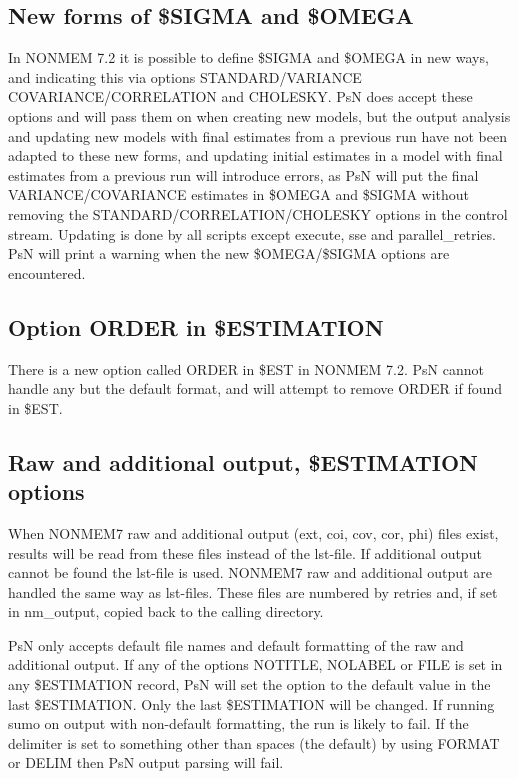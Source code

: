 \subsection{New forms of \$SIGMA and \$OMEGA}
In NONMEM 7.2 it is possible to define \$SIGMA and \$OMEGA in new ways, and indicating this via options STANDARD/VARIANCE COVARIANCE/CORRELATION and CHOLESKY. PsN does accept these options and will pass them on when creating new models, but the output analysis and updating new models with final estimates from a previous run have not been adapted to these new forms, and 
updating initial estimates in a model with final estimates from a previous run
will introduce errors, as PsN will put the final VARIANCE/COVARIANCE estimates
in \$OMEGA and \$SIGMA without removing the STANDARD/CORRELATION/CHOLESKY
options in the control stream. 
Updating is done by all scripts except execute, sse and parallel\_retries. 
PsN will print a warning when the new \$OMEGA/\$SIGMA options are encountered.

\subsection{Option ORDER in \$ESTIMATION}
There is a new option called ORDER in \$EST in NONMEM 7.2. PsN 
cannot handle any but the default format, and will attempt to
remove ORDER if found in \$EST.

\subsection{Raw and additional output, \$ESTIMATION options}

When NONMEM7 raw and additional output (ext, coi, cov, cor, phi) files exist, 
results will be read from these files instead of the lst-file. 
If additional output cannot be found the lst-file is used. NONMEM7 raw and additional output are handled the same way as lst-files. These files are numbered by retries and, if set in nm\_output, copied back to the calling directory.

PsN only accepts default file names and default formatting of the raw and additional output. If any of the options NOTITLE, NOLABEL or FILE is set in any \$ESTIMATION record, PsN will set the option to the default value in the last \$ESTIMATION. Only the last \$ESTIMATION will be changed. If running sumo on output with non-default formatting, the run is likely to fail. If the delimiter is set to something other than spaces (the default) by using FORMAT or DELIM then PsN output parsing will fail.

